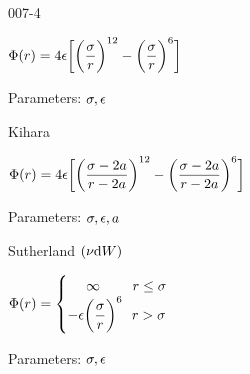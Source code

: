 \begin{mitframe}{007-4}
\begin{listone}
\begin{listtwo}
    \end{listtwo}
        
    \item {}
    
    \begin{listtwo}
        
    	\item $\pot(\pos) = 4\dielec\bigg[\bigg(\dfrac{\molecrad}{\pos}\bigg)^{12}-\bigg(\dfrac{\molecrad}{\pos}\bigg)^6\bigg] $
    
    	\item Parameters: $\molecrad, \dielec$

    
    \end{listtwo}
    
    \item Kihara
    
    \begin{listtwo}
    
    	\item $\pot(\pos) = 4\dielec\bigg[\bigg(\dfrac{\molecrad-2\activity}{\pos-2\activity}\bigg)^{12}-\bigg(\dfrac{\molecrad-2\activity}{\pos-2\activity}\bigg)^6\bigg] $
    
    	\item Parameters: $\molecrad, \dielec, \activity$

        
    
    \end{listtwo}
    
    \item Sutherland $(\freq \mathrm{d}\work)$
    
    \begin{listtwo}
    
    	\item $\pot(\pos)=\begin{cases}
                    ~~~~\infty ~~~~~~~ \pos \leq \molecrad\\
                    -\dielec\bigg(\dfrac{\molecrad}{\pos}\bigg)^6 ~~ \pos > \molecrad\\
                \end{cases}$
                
    	\item Parameters: $\molecrad, \dielec$
	
    
    \end{listtwo}
    
\end{listone}

\end{mitframe}